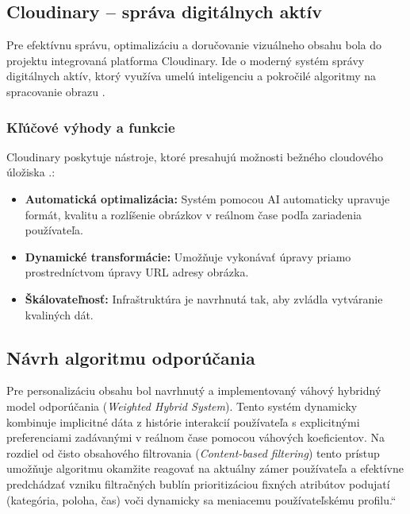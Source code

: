 \subsection{Cloudinary – správa digitálnych aktív}
Pre efektívnu správu, optimalizáciu a doručovanie vizuálneho obsahu 
bola do projektu integrovaná platforma Cloudinary. Ide o moderný systém správy digitálnych aktív, 
ktorý využíva umelú inteligenciu a pokročilé algoritmy na spracovanie obrazu \cite{cloudinary_blog}.

\subsubsection{Kľúčové výhody a funkcie}
Cloudinary poskytuje nástroje, ktoré presahujú možnosti bežného cloudového úložiska \cite{cloudinary_blog}.:
\begin{itemize}
    \item \textbf{Automatická optimalizácia:} Systém pomocou AI automaticky upravuje formát, kvalitu a rozlíšenie obrázkov v reálnom čase podľa zariadenia používateľa.
    \item \textbf{Dynamické transformácie:} Umožňuje vykonávať úpravy  priamo prostredníctvom úpravy URL adresy obrázka.
    \item \textbf{Škálovateľnosť:} Infraštruktúra je navrhnutá tak, aby zvládla vytváranie kvaliných dát.
\end{itemize}

\subsection{Návrh algoritmu odporúčania}
Pre personalizáciu obsahu bol navrhnutý a implementovaný váhový hybridný model odporúčania
(\textit{Weighted Hybrid System}). Tento systém dynamicky kombinuje implicitné dáta z histórie interakcií
používateľa s explicitnými preferenciami zadávanými v reálnom čase pomocou váhových koeficientov. Na rozdiel 
od čisto obsahového filtrovania (\textit{Content-based filtering}) tento prístup umožňuje algoritmu okamžite 
reagovať na aktuálny zámer používateľa a efektívne predchádzať vzniku filtračných bublín prioritizáciou fixných
atribútov podujatí (kategória, poloha, čas) voči dynamicky sa meniacemu používateľskému profilu.“

